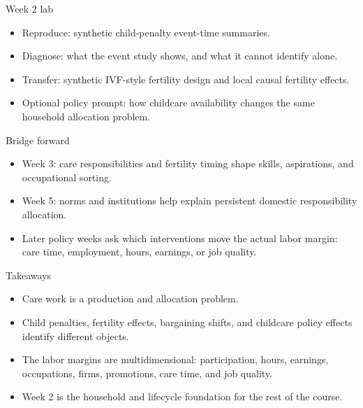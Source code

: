 \documentclass[aspectratio=169,11pt]{beamer}
\begin{document}
\begin{frame}{Week 2 lab}
\begin{itemize}
    \item Reproduce: synthetic child-penalty event-time summaries.
    \item Diagnose: what the event study shows, and what it cannot identify alone.
    \item Transfer: synthetic IVF-style fertility design and local causal fertility effects.
    \item Optional policy prompt: how childcare availability changes the same household allocation problem.
\end{itemize}
\end{frame}

\begin{frame}{Bridge forward}
\begin{itemize}
    \item Week 3: care responsibilities and fertility timing shape skills, aspirations, and occupational sorting.
    \item Week 5: norms and institutions help explain persistent domestic responsibility allocation.
    \item Later policy weeks ask which interventions move the actual labor margin: care time, employment, hours, earnings, or job quality.
\end{itemize}
\end{frame}

\begin{frame}{Takeaways}
\begin{itemize}
    \item Care work is a production and allocation problem.
    \item Child penalties, fertility effects, bargaining shifts, and childcare policy effects identify different objects.
    \item The labor margins are multidimensional: participation, hours, earnings, occupations, firms, promotions, care time, and job quality.
    \item Week 2 is the household and lifecycle foundation for the rest of the course.
\end{itemize}
\end{frame}
\end{document}
